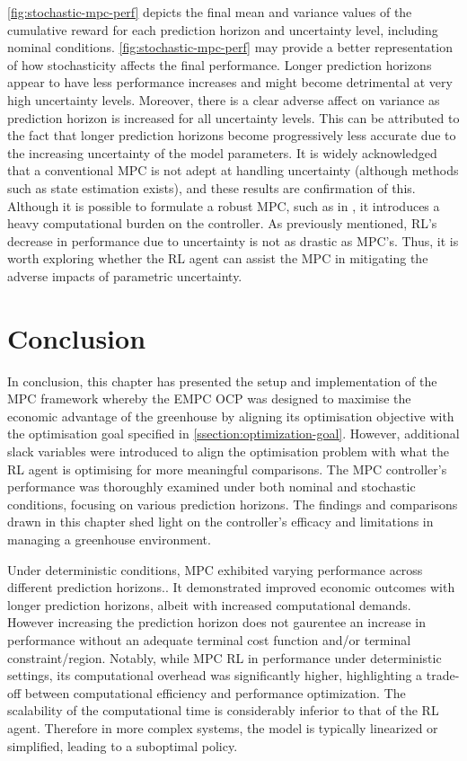 \autoref{fig:stochastic-mpc-perf} depicts the final mean and variance values of the cumulative reward for each prediction horizon and uncertainty level, including nominal conditions. \autoref{fig:stochastic-mpc-perf} may provide a better representation of how stochasticity affects the final performance. Longer prediction horizons appear to have less performance increases and might become detrimental at very high uncertainty levels. Moreover, there is a clear adverse affect on variance as prediction horizon is increased for all uncertainty levels. This can be attributed to the fact that longer prediction horizons become progressively less accurate due to the increasing uncertainty of the model parameters. It is widely acknowledged that a conventional MPC is not adept at handling uncertainty (although methods such as state estimation exists), and these results are confirmation of this. Although it is possible to formulate a robust MPC, such as in \cite{boersmaRobustSamplebasedModel2022}, it introduces a heavy computational burden on the controller. As previously mentioned, RL's decrease in performance due to uncertainty is not as drastic as MPC's. Thus, it is worth exploring whether the RL agent can assist the MPC in mitigating the adverse impacts of parametric uncertainty.


\section{Conclusion}
In conclusion, this chapter has presented the setup and implementation of the MPC framework whereby the EMPC OCP was designed to maximise the economic advantage of the greenhouse by aligning its optimisation objective with the optimisation goal specified in \autoref{ssection:optimization-goal}. However, additional slack variables were introduced to align the optimisation problem with what the RL agent is optimising for more meaningful comparisons. The MPC controller's performance was thoroughly examined under both nominal and stochastic conditions, focusing on various prediction horizons. The findings and comparisons drawn in this chapter shed light on the controller's efficacy and limitations in managing a greenhouse environment.

Under deterministic conditions, MPC exhibited varying performance across different prediction horizons.. It demonstrated improved economic outcomes with longer prediction horizons, albeit with increased computational demands. However increasing the prediction horizon does not gaurentee an increase in performance without an adequate terminal cost function and/or terminal constraint/region. Notably, while MPC RL in performance under deterministic settings, its computational overhead was significantly higher, highlighting a trade-off between computational efficiency and performance optimization. The scalability of the computational time is considerably inferior to that of the RL agent. Therefore in more complex systems, the model is typically linearized or simplified, leading to a suboptimal policy.

